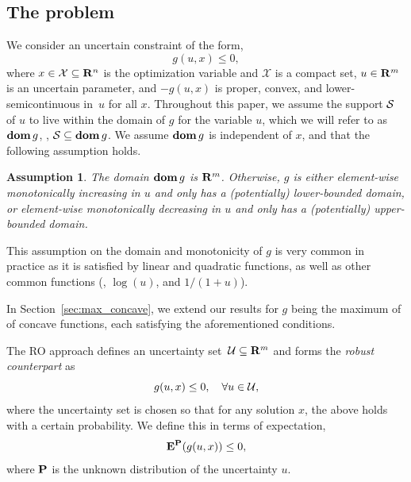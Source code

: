 \documentclass[12pt]{article}
\theoremstyle{thmstyleone}%
\theoremstyle{thmstyletwo}%
\theoremstyle{thmstylethree}%
\newtheorem{assumption}{Assumption}%
\newcommand{\reviewChanges}{}
\begin{document}
\subsection{The problem}
\label{sec:intro}
We consider an uncertain constraint of the form,
\begin{equation}
	\label{eq:constr_original}
	g(u,x) \le 0,
\end{equation}
where \reviewChanges{$x \in \mathcal{X} \subseteq {\mathbf R}^n$ is the optimization variable and $\mathcal{X}$ is a compact set}, $u \in {\mathbf R}^m$ is an uncertain parameter, and \reviewChanges{$-g(u, x)$ is proper, convex, and lower-semicontinuous in~$u$ for all $x$.}
\reviewChanges{Throughout this paper, we assume the support $\mathcal{S}$ of $u$ to live within the domain of $g$ for the variable $u$, which we will refer to as $\mathop{\bf dom}{g}$, \ie, $\mathcal{S} \subseteq \mathop{\bf dom}{g}$.
We assume $\mathop{\bf dom}{g}$ is independent of $x$, and that the following assumption holds. }
\begin{assumption}
	\label{assp:dom}
	The domain $\mathop{\bf dom}{g}$ is ${\mathbf R}^m$. \reviewChanges{Otherwise, $g$ is either element-wise monotonically increasing in $u$ and only has a (potentially) lower-bounded domain, or element-wise monotonically decreasing in $u$ and only has a (potentially) upper-bounded domain.}
\end{assumption}
\reviewChanges{This assumption on the domain and monotonicity of $g$ is very common in practice as it is satisfied by linear and quadratic functions, as well as other common functions (\eg, $\log(u)$, and $1/(1+u)$).}

\reviewChanges{In Section~\ref{sec:max_concave}, we extend our results for $g$ being the maximum of of concave functions, each satisfying the aforementioned conditions.}

The \gls{RO} approach defines an uncertainty set~${\mathcal{U}} \subseteq {\mathbf R}^m$ and forms the {\it robust counterpart} as
\begin{equation*}
	g(u,x) \le 0, \quad \forall u \in {\mathcal{U}},
\end{equation*}
where the uncertainty set is chosen so that for any solution $x$, the above holds with a certain probability. We define this in terms of expectation,
\begin{equation}
	\label{eq:expectation}
	\mathbf{E}^{\mathbf P} (g(u,x)) \le 0,
\end{equation}
where ${\mathbf P}$ is the unknown distribution of the uncertainty $u$.
\end{document}
